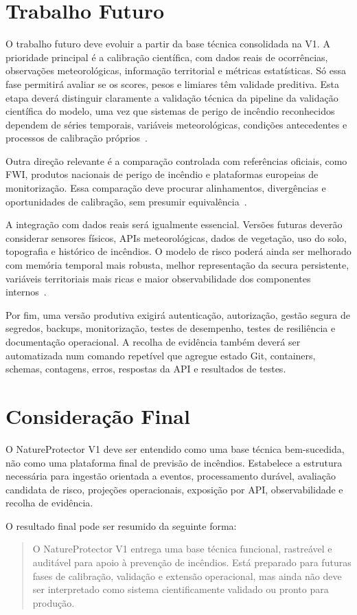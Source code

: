 \section{Trabalho Futuro}

O trabalho futuro deve evoluir a partir da base técnica consolidada na V1. A prioridade principal é a calibração científica, com dados reais de ocorrências, observações meteorológicas, informação territorial e métricas estatísticas. Só essa fase permitirá avaliar se os scores, pesos e limiares têm validade preditiva. Esta etapa deverá distinguir claramente a validação técnica da pipeline da validação científica do modelo, uma vez que sistemas de perigo de incêndio reconhecidos dependem de séries temporais, variáveis meteorológicas, condições antecedentes e processos de calibração próprios~\citep{nrcan_fwi_system,keetch_byram_1968,ipma_fwi}.

Outra direção relevante é a comparação controlada com referências oficiais, como FWI, produtos nacionais de perigo de incêndio e plataformas europeias de monitorização. Essa comparação deve procurar alinhamentos, divergências e oportunidades de calibração, sem presumir equivalência~\citep{ipma_fwi,ipma_pir_rcm,ec_jrc_effis}.

A integração com dados reais será igualmente essencial. Versões futuras deverão considerar sensores físicos, APIs meteorológicas, dados de vegetação, uso do solo, topografia e histórico de incêndios. O modelo de risco poderá ainda ser melhorado com memória temporal mais robusta, melhor representação da secura persistente, variáveis territoriais mais ricas e maior observabilidade dos componentes internos~\citep{clms_corine_land_cover,dgt_cos,nasa_firms,wmo_no8}.

Por fim, uma versão produtiva exigirá autenticação, autorização, gestão segura de segredos, backups, monitorização, testes de desempenho, testes de resiliência e documentação operacional. A recolha de evidência também deverá ser automatizada num comando repetível que agregue estado Git, containers, schemas, contagens, erros, respostas da API e resultados de testes.

\section{Consideração Final}

O NatureProtector V1 deve ser entendido como uma base técnica bem-sucedida, não como uma plataforma final de previsão de incêndios. Estabelece a estrutura necessária para ingestão orientada a eventos, processamento durável, avaliação candidata de risco, projeções operacionais, exposição por API, observabilidade e recolha de evidência.

O resultado final pode ser resumido da seguinte forma:

\begin{quote}
O NatureProtector V1 entrega uma base técnica funcional, rastreável e auditável para apoio à prevenção de incêndios. Está preparado para futuras fases de calibração, validação e extensão operacional, mas ainda não deve ser interpretado como sistema cientificamente validado ou pronto para produção.
\end{quote}
